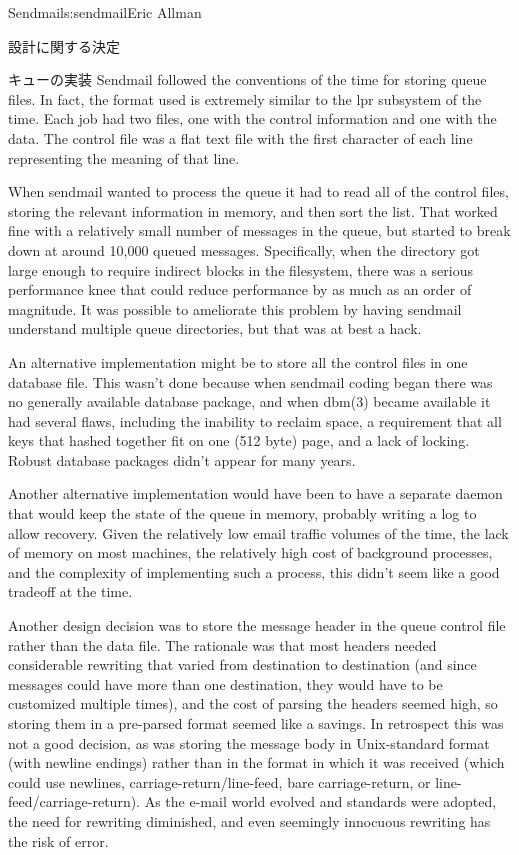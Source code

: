 \begin{aosachapter}{Sendmail}{s:sendmail}{Eric Allman}
\begin{aosasect1}{設計に関する決定}
\begin{aosasect2}{キューの実装}
Sendmail followed the conventions of the time for storing queue files.
In fact, the format used is extremely similar to the lpr subsystem of
the time.  Each job had two files, one with the control information
and one with the data. The control file was a flat text file with the
first character of each line representing the meaning of that line.

When sendmail wanted to process the queue it had to read all of the
control files, storing the relevant information in memory, and then
sort the list. That worked fine with a relatively small number of
messages in the queue, but started to break down at around 10,000
queued messages. Specifically, when the directory got large enough to
require indirect blocks in the filesystem, there was a serious
performance knee that could reduce performance by as much as an order
of magnitude. It was possible to ameliorate this problem by having
sendmail understand multiple queue directories, but that was at best a
hack.

An alternative implementation might be to store all the control files
in one database file. This wasn't done because when sendmail coding
began there was no generally available database package, and when
dbm(3) became available it had several flaws, including the inability
to reclaim space, a requirement that all keys that hashed together fit
on one (512 byte) page, and a lack of locking. Robust database
packages didn't appear for many years.

Another alternative implementation would have been to have a separate
daemon that would keep the state of the queue in memory, probably
writing a log to allow recovery. Given the relatively low email
traffic volumes of the time, the lack of memory on most machines,
the relatively high cost of background processes,
and the complexity of implementing such a process,
this didn't seem
like a good tradeoff at the time.

Another design decision was to store the message header in the queue
control file rather than the data file. The rationale was that most
headers needed considerable rewriting that varied from destination to
destination (and since messages could have more than one destination,
they would have to be customized multiple times), and the cost of
parsing the headers seemed high, so storing them in a pre-parsed
format seemed like a savings. In retrospect this was not a good decision,
as was storing the message body in Unix-standard format (with newline
endings) rather than in the format in which it was received (which
could use newlines, carriage-return/line-feed, bare carriage-return,
or line-feed/carriage-return). As the e-mail world evolved and
standards were adopted, the need for rewriting diminished, and even
seemingly innocuous rewriting has the risk of error.


\end{aosasect2}
\end{aosasect1}
\end{aosachapter}
